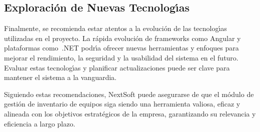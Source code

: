 \documentclass[stu, 12pt, letterpaper, donotrepeattitle, floatsintext, natbib]{apa7}
\begin{document}
\subsection{Exploraci\'on de Nuevas Tecnolog\'{\i}as}
Finalmente, se recomienda estar atentos a la evoluci\'on de las tecnolog\'{\i}as utilizadas en el proyecto. La r\'apida evoluci\'on de frameworks como Angular y plataformas como~.NET podr\'{\i}a ofrecer nuevas herramientas y enfoques para mejorar el rendimiento, la seguridad y la usabilidad del sistema en el futuro. Evaluar estas tecnolog\'{\i}as y planificar actualizaciones puede ser clave para mantener el sistema a la vanguardia.

Siguiendo estas recomendaciones, NextSoft puede asegurarse de que el m\'odulo de gesti\'on de inventario de equipos siga siendo una herramienta valiosa, eficaz y alineada con los objetivos estrat\'egicos de la empresa, garantizando su relevancia y eficiencia a largo plazo.
\newpage

\nocite{*}
\end{document}
